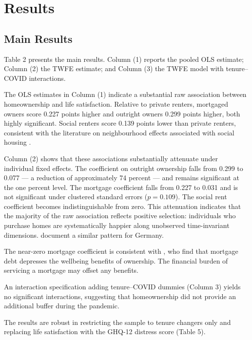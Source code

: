 \documentclass[12pt,a4paper]{article}
\begin{document}
\section{Results}
 
\subsection{Main Results}
 
Table 2 presents the main results. Column (1) reports the pooled OLS
estimate; Column (2) the TWFE estimate; and Column (3) the TWFE model with
tenure--COVID interactions.
 
The OLS estimates in Column (1) indicate a substantial raw association
between homeownership and life satisfaction. Relative to private renters,
mortgaged owners score 0.227 points higher and outright owners 0.299 points
higher, both highly significant. Social renters score 0.139 points lower
than private renters, consistent with the literature on neighbourhood effects
associated with social housing \citep{Rohe2002}.
 
Column (2) shows that these associations substantially attenuate under
individual fixed effects. The coefficient on outright ownership falls from
0.299 to 0.077 --- a reduction of approximately 74 percent --- and remains
significant at the one percent level. The mortgage coefficient falls from
0.227 to 0.031 and is not significant under clustered standard errors
($p = 0.109$). The social rent coefficient becomes indistinguishable from
zero. This attenuation indicates that the majority of the raw association
reflects positive selection: individuals who purchase homes are
systematically happier along unobserved time-invariant dimensions.
\citet{Will2024} document a similar pattern for Germany.
 
The near-zero mortgage coefficient is consistent with \citet{ViforJ2024},
who find that mortgage debt depresses the wellbeing benefits of ownership. The financial burden of servicing a mortgage may offset any benefits. 

An interaction specification adding tenure--COVID dummies (Column 3) yields no significant interactions, suggesting that homeownership did not provide an additional buffer during the pandemic.

The results are robust in restricting the sample to tenure changers only and replacing life satisfaction with the GHQ-12 distress score (Table 5).
\end{document}
